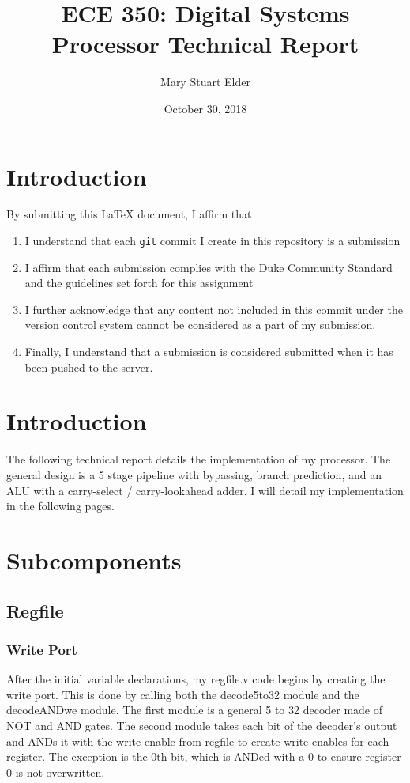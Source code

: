 \documentclass[letterpaper]{article} %
\begin{document}
\title{ECE 350: Digital Systems Processor Technical Report}
\author{Mary Stuart Elder} %
\date{October 30, 2018} %
\maketitle

\section{Introduction}

By submitting this \LaTeX{} document, I affirm that
\begin{enumerate}
    \item I understand that each \texttt{git} commit I create in this repository is a submission
    \item I affirm that each submission complies with the Duke Community Standard and the guidelines set forth for this assignment
    \item I further acknowledge that any content not included in this commit under the version control system cannot be considered as a part of my submission.
    \item Finally, I understand that a submission is considered submitted when it has been pushed to the server.
\end{enumerate}

\section{Introduction}
The following technical report details the implementation of my processor. The general design is a 5 stage pipeline with bypassing, branch prediction, and an ALU with a carry-select / carry-lookahead adder. I will detail my implementation in the following pages.

\section{Subcomponents}
\subsection{Regfile}
\subsubsection{Write Port}
After the initial variable declarations, my regfile.v code begins by creating the write port. This is done by calling both the decode5to32 module and the decodeANDwe module. The first module is a general 5 to 32 decoder made of NOT and AND gates. The second module takes each bit of the decoder's output and ANDs it with the write enable from regfile to create write enables for each register. The exception is the 0th bit, which is ANDed with a 0 to ensure register 0 is not overwritten.
\end{document}
